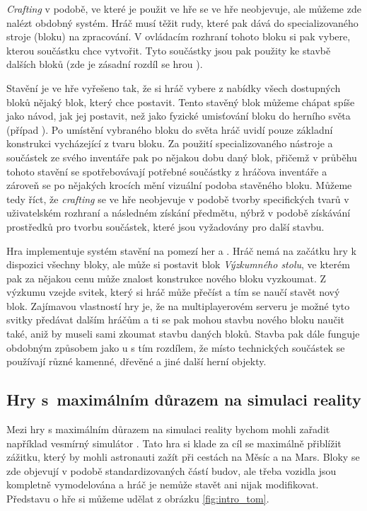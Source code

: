 \textit{Crafting} v podobě, ve které je použit ve hře \MC{} se ve hře \SE{} neobjevuje, ale můžeme zde nalézt obdobný systém. Hráč musí těžit rudy, které pak dává do specializovaného stroje (bloku) na zpracování. V ovládacím rozhraní tohoto bloku si pak vybere, kterou součástku chce vytvořit. Tyto součástky jsou pak použity ke stavbě dalších bloků (zde je zásadní rozdíl se hrou \MC{}).

Stavění je ve hře \SE{} vyřešeno tak, že si hráč vybere z nabídky všech dostupných bloků nějaký blok, který chce postavit. Tento stavěný blok můžeme chápat spíše jako návod, jak jej postavit, než jako fyzické umisťování bloku do herního světa (případ ). Po umístění vybraného bloku do světa hráč uvidí pouze základní konstrukci vycházející z tvaru bloku. Za použití specializovaného nástroje a součástek ze svého inventáře pak po nějakou dobu  daný blok, přičemž v průběhu tohoto stavění se spotřebovávají potřebné součástky z hráčova inventáře a zároveň se po nějakých krocích mění vizuální podoba stavěného bloku. Můžeme tedy říct, že \textit{crafting} se ve hře \SE{} neobjevuje v podobě tvorby specifických tvarů v uživatelském rozhraní a následném získání předmětu, nýbrž v podobě získávání prostředků pro tvorbu součástek, které jsou vyžadovány pro další stavbu.

Hra \ME{} implementuje systém stavění na pomezí her \MC{} a \SE{}. Hráč nemá na začátku hry k dispozici všechny bloky, ale může si postavit blok \textit{Výzkumného stolu}, ve kterém pak za nějakou cenu může znalost konstrukce nového bloku vyzkoumat. Z výzkumu vzejde svitek, který si hráč může přečíst a tím se naučí stavět nový blok. Zajímavou vlastností hry je, že na multiplayerovém serveru je možné tyto svitky předávat dalším hráčům a ti se pak mohou stavbu nového bloku naučit také, aniž by museli sami zkoumat stavbu daných bloků. Stavba pak dále funguje obdobným způsobem jako u \SE{} s tím rozdílem, že místo technických součástek se používají různé kamenné, dřevěné a jiné další herní objekty. 




\subsection{Hry s~maximálním důrazem na simulaci reality}

Mezi hry s maximálním důrazem na simulaci reality bychom mohli zařadit například vesmírný simulátor \TM{}. Tato hra si klade za cíl se maximálně přiblížit zážitku, který by mohli astronauti zažít při cestách na Měsíc a na Mars. Bloky se zde objevují v podobě standardizovaných částí budov, ale třeba vozidla jsou kompletně vymodelována a hráč je nemůže stavět ani nijak modifikovat. Představu o hře si můžeme udělat z obrázku \ref{fig:intro_tom}.

